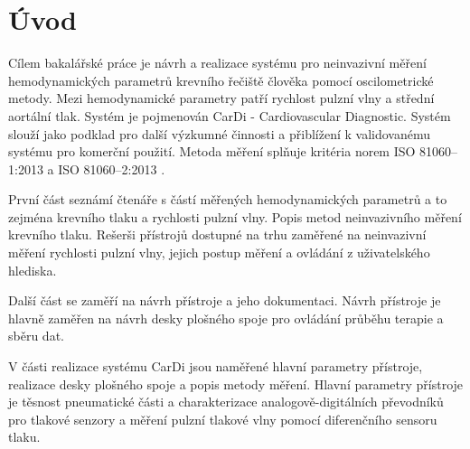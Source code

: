 \documentclass{ctuthesis}
\begin{document}
\maketitle



\chapter{Úvod}
Cílem bakalářské práce je návrh a realizace systému pro neinvazivní měření hemodynamických parametrů krevního řečiště člověka pomocí oscilometrické metody. Mezi hemodynamické parametry patří rychlost pulzní vlny a střední aortální tlak.
Systém je pojmenován CarDi - Cardiovascular Diagnostic. Systém slouží jako podklad pro další výzkumné činnosti a přiblížení k validovanému systému pro komerční použití. Metoda měření splňuje kritéria norem ISO 81060–1:2013 a ISO 81060–2:2013 \cite{cite:Validation}.

\par
První část seznámí čtenáře s částí měřených hemodynamických parametrů a to zejména krevního tlaku a rychlosti pulzní vlny. Popis metod neinvazivního měření krevního tlaku. Rešerši přístrojů dostupné na trhu zaměřené na neinvazivní měření rychlosti pulzní vlny, jejich postup měření a ovládání z uživatelského hlediska.
\par
Další část se zaměří na návrh přístroje a jeho dokumentaci. Návrh přístroje je hlavně zaměřen na návrh desky plošného spoje pro ovládání průběhu terapie a sběru dat.
\par
V části realizace systému CarDi jsou naměřené hlavní parametry přístroje, realizace desky plošného spoje a popis metody měření. Hlavní parametry přístroje je těsnost pneumatické části a charakterizace analogově-digitálních převodníků pro tlakové senzory a měření pulzní tlakové vlny pomocí diferenčního sensoru tlaku.








\end{document}

